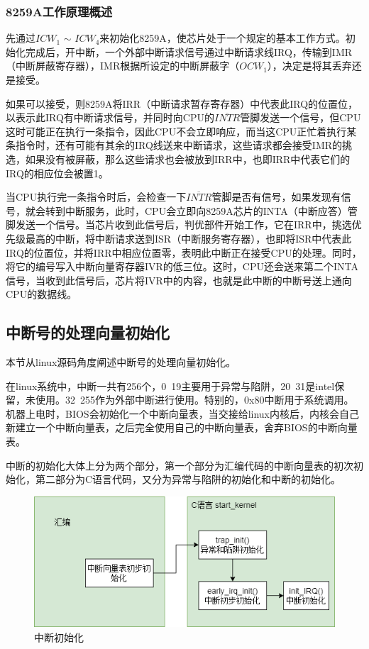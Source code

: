 \documentclass[UTF8,12pt]{ctexart}
\begin{document}
    \subsubsection{8259A工作原理概述}
    
    先通过$ICW_1$ $\sim$ $ICW_4$来初始化8259A，使芯片处于一个规定的基本工作方式。初始化完成后，开中断，一个外部中断请求信号通过中断请求线IRQ，传输到IMR（中断屏蔽寄存器），IMR根据所设定的中断屏蔽字（$OCW_1$），决定是将其丢弃还是接受。
    
    如果可以接受，则8259A将IRR（中断请求暂存寄存器）中代表此IRQ的位置位，以表示此IRQ有中断请求信号，并同时向CPU的$\overline{INTR}$管脚发送一个信号，但CPU这时可能正在执行一条指令，因此CPU不会立即响应，而当这CPU正忙着执行某条指令时，还有可能有其余的IRQ线送来中断请求，这些请求都会接受IMR的挑选，如果没有被屏蔽，那么这些请求也会被放到IRR中，也即IRR中代表它们的IRQ的相应位会被置1。
    
    当CPU执行完一条指令时后，会检查一下$\overline{INTR}$管脚是否有信号，如果发现有信号，就会转到中断服务，此时，CPU会立即向8259A芯片的INTA（中断应答）管脚发送一个信号。当芯片收到此信号后，判优部件开始工作，它在IRR中，挑选优先级最高的中断，将中断请求送到ISR（中断服务寄存器），也即将ISR中代表此IRQ的位置位，并将IRR中相应位置零，表明此中断正在接受CPU的处理。同时，将它的编号写入中断向量寄存器IVR的低三位。这时，CPU还会送来第二个INTA信号，当收到此信号后，芯片将IVR中的内容，也就是此中断的中断号送上通向CPU的数据线。
    
    \subsection{中断号的处理向量初始化}
    本节从linux源码角度阐述中断号的处理向量初始化。
    
    在linux系统中，中断一共有256个，0~19主要用于异常与陷阱，20~31是intel保留，未使用。32~255作为外部中断进行使用。特别的，0x80中断用于系统调用。机器上电时，BIOS会初始化一个中断向量表，当交接给linux内核后，内核会自己新建立一个中断向量表，之后完全使用自己的中断向量表，舍弃BIOS的中断向量表。
    
    中断的初始化大体上分为两个部分，第一个部分为汇编代码的中断向量表的初次初始化，第二部分为C语言代码，又分为异常与陷阱的初始化和中断的初始化。
    \begin{figure}[H]
        \centering
        \includegraphics[width=12cm]{images/中断初始化.png}
        \caption{中断初始化}
        \label{中断初始化}
    \end{figure}
    
\end{document}
